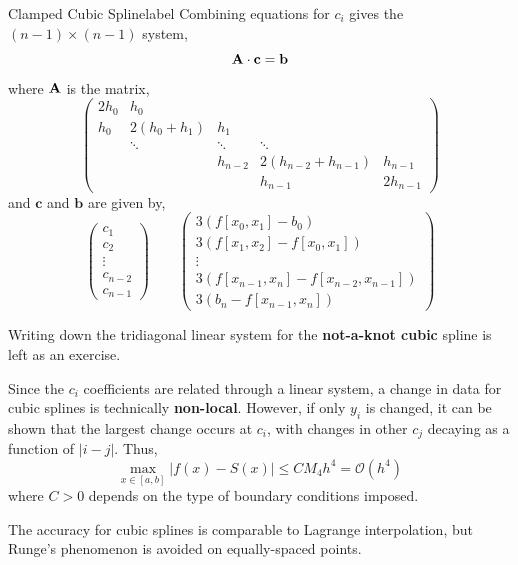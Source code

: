 \begin{ex}{Clamped Cubic Spline}{label}
    Combining equations for $c_i$ gives the $(n - 1) \times (n - 1)$ system,
    \[\mathbf{A} \cdot \mathbf{c} = \mathbf{b}\]
    where $\mathbf{A}$ is the matrix,
    \[
       \left(\begin{array}{ccccc}
        2 h_0 & h_0 & & & \\
        h_0 & 2\left(h_0+h_1\right) & h_1 & & \\
        & \ddots & \ddots & \ddots & \\
        & & h_{n-2} & 2\left(h_{n-2}+h_{n-1}\right) & h_{n-1} \\
        & & & h_{n-1} & 2 h_{n-1}
        \end{array}\right)
    \]
    and $\mathbf{c}$ and $\mathbf{b}$ are given by,
    \[
    \left(\begin{array}{c}
    c_1 \\
    c_2 \\
    \vdots \\
    c_{n-2} \\
    c_{n-1}
    \end{array}\right) \quad \quad \left(\begin{array}{c}
    3\left(f\left[x_0, x_1\right]-b_0\right) \\
    3\left(f\left[x_1, x_2\right]-f\left[x_0, x_1\right]\right) \\
    \vdots \\
    3\left(f\left[x_{n-1}, x_n\right]-f\left[x_{n-2}, x_{n-1}\right]\right) \\
    3\left(b_n-f\left[x_{n-1}, x_n\right]\right)
    \end{array}\right)
    \]
\end{ex}

\begin{rmk}
     Writing down the tridiagonal linear system for the \textbf{not-a-knot cubic} spline is left as an exercise. 
\end{rmk}

\noindent Since the $c_i$ coefficients are related through a linear system, a change in data for cubic splines is technically \textbf{non-local}. However, if only $y_i$ is changed, it can be shown that the largest change occurs at $c_i$, with changes in other $c_j$ decaying as a function of $|i - j|$. Thus, 
\[\max _{x \in[a, b]}|f(x)-S(x)| \leq C M_4 h^4=\mathcal{O}\left(h^4\right)\]
where $C > 0$ depends on the type of boundary conditions imposed.

\begin{marginfigure}
    The accuracy for cubic splines is comparable to Lagrange interpolation, but Runge's phenomenon is avoided on equally-spaced points.
\end{marginfigure}